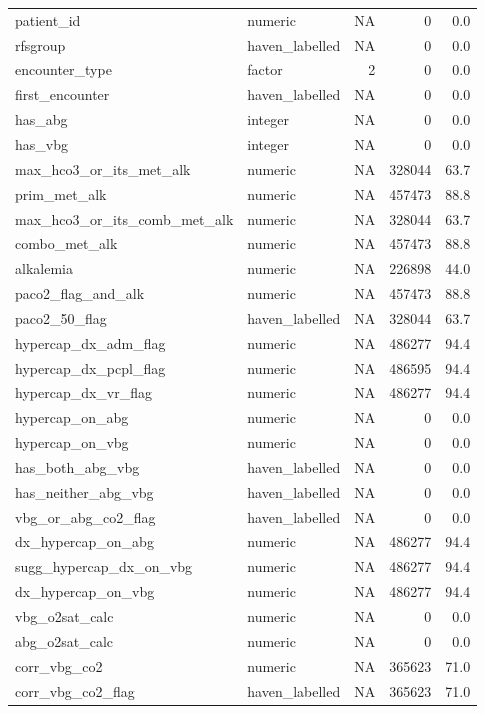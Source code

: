\documentclass[
  11pt,
  letterpaper,
  DIV=11,
  numbers=noendperiod]{scrartcl}
\begin{document}
\begin{longtable*}{llrrr}
patient\_id & numeric & NA & 0 & 0.0\\
rfsgroup & haven\_labelled & NA & 0 & 0.0\\
encounter\_type & factor & 2 & 0 & 0.0\\
first\_encounter & haven\_labelled & NA & 0 & 0.0\\
\addlinespace
has\_abg & integer & NA & 0 & 0.0\\
has\_vbg & integer & NA & 0 & 0.0\\
max\_hco3\_or\_its\_met\_alk & numeric & NA & 328044 & 63.7\\
prim\_met\_alk & numeric & NA & 457473 & 88.8\\
max\_hco3\_or\_its\_comb\_met\_alk & numeric & NA & 328044 & 63.7\\
\addlinespace
combo\_met\_alk & numeric & NA & 457473 & 88.8\\
alkalemia & numeric & NA & 226898 & 44.0\\
paco2\_flag\_and\_alk & numeric & NA & 457473 & 88.8\\
paco2\_50\_flag & haven\_labelled & NA & 328044 & 63.7\\
hypercap\_dx\_adm\_flag & numeric & NA & 486277 & 94.4\\
\addlinespace
hypercap\_dx\_pcpl\_flag & numeric & NA & 486595 & 94.4\\
hypercap\_dx\_vr\_flag & numeric & NA & 486277 & 94.4\\
hypercap\_on\_abg & numeric & NA & 0 & 0.0\\
hypercap\_on\_vbg & numeric & NA & 0 & 0.0\\
has\_both\_abg\_vbg & haven\_labelled & NA & 0 & 0.0\\
\addlinespace
has\_neither\_abg\_vbg & haven\_labelled & NA & 0 & 0.0\\
vbg\_or\_abg\_co2\_flag & haven\_labelled & NA & 0 & 0.0\\
dx\_hypercap\_on\_abg & numeric & NA & 486277 & 94.4\\
sugg\_hypercap\_dx\_on\_vbg & numeric & NA & 486277 & 94.4\\
dx\_hypercap\_on\_vbg & numeric & NA & 486277 & 94.4\\
\addlinespace
vbg\_o2sat\_calc & numeric & NA & 0 & 0.0\\
abg\_o2sat\_calc & numeric & NA & 0 & 0.0\\
corr\_vbg\_co2 & numeric & NA & 365623 & 71.0\\
corr\_vbg\_co2\_flag & haven\_labelled & NA & 365623 & 71.0\\

\end{longtable*}
\end{document}

